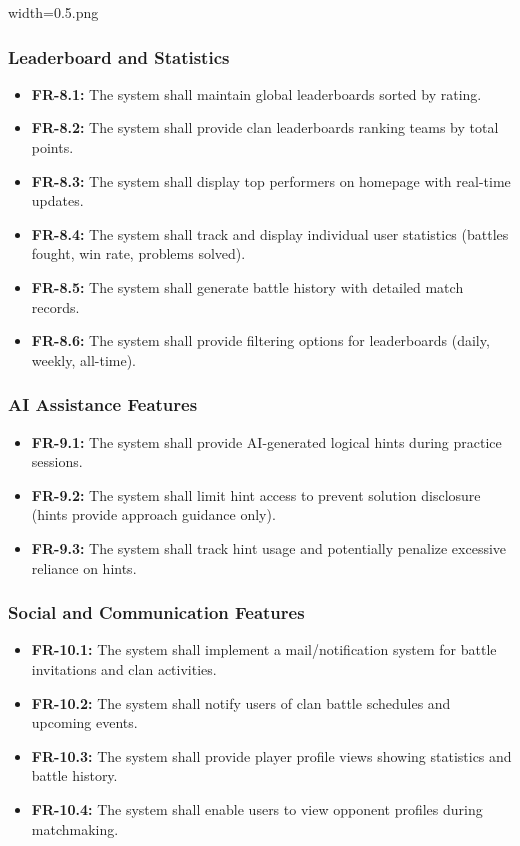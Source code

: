 width=0.5\linewidthimage.png\documentclass[12pt,a4paper]{article}
\begin{document}
\subsubsection{Leaderboard and Statistics}
\begin{itemize}
\item \textbf{FR-8.1:} The system shall maintain global leaderboards sorted by rating.
\item \textbf{FR-8.2:} The system shall provide clan leaderboards ranking teams by total points.
\item \textbf{FR-8.3:} The system shall display top performers on homepage with real-time updates.
\item \textbf{FR-8.4:} The system shall track and display individual user statistics (battles fought, win rate, problems solved).
\item \textbf{FR-8.5:} The system shall generate battle history with detailed match records.
\item \textbf{FR-8.6:} The system shall provide filtering options for leaderboards (daily, weekly, all-time).
\end{itemize}

\subsubsection{AI Assistance Features}
\begin{itemize}
\item \textbf{FR-9.1:} The system shall provide AI-generated logical hints during practice sessions.
\item \textbf{FR-9.2:} The system shall limit hint access to prevent solution disclosure (hints provide approach guidance only).
\item \textbf{FR-9.3:} The system shall track hint usage and potentially penalize excessive reliance on hints.
\end{itemize}

\subsubsection{Social and Communication Features}
\begin{itemize}
\item \textbf{FR-10.1:} The system shall implement a mail/notification system for battle invitations and clan activities.
\item \textbf{FR-10.2:} The system shall notify users of clan battle schedules and upcoming events.
\item \textbf{FR-10.3:} The system shall provide player profile views showing statistics and battle history.
\item \textbf{FR-10.4:} The system shall enable users to view opponent profiles during matchmaking.
\end{itemize}
\end{document}
